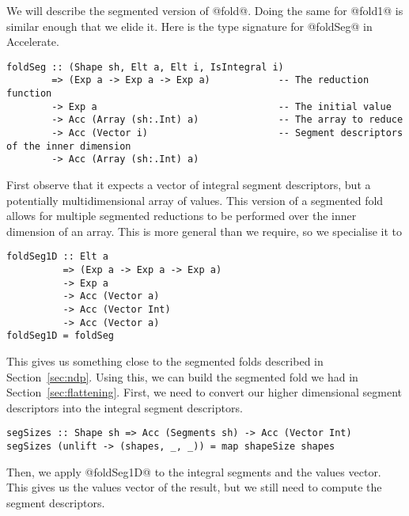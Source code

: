 We will describe the segmented version of @fold@. Doing the same for @fold1@ is similar enough that we elide it. Here is the type signature for @foldSeg@ in Accelerate.
%
\begin{lstlisting}
foldSeg :: (Shape sh, Elt a, Elt i, IsIntegral i)
        => (Exp a -> Exp a -> Exp a)            -- The reduction function
        -> Exp a                                -- The initial value
        -> Acc (Array (sh:.Int) a)              -- The array to reduce
        -> Acc (Vector i)                       -- Segment descriptors of the inner dimension
        -> Acc (Array (sh:.Int) a)
\end{lstlisting}
%
First observe that it expects a vector of integral segment descriptors, but a potentially multidimensional array of values. This version of a segmented fold allows for multiple segmented reductions to be performed over the inner dimension of an array. This is more general than we require, so we specialise it to
%
\begin{lstlisting}
foldSeg1D :: Elt a
          => (Exp a -> Exp a -> Exp a)
          -> Exp a
          -> Acc (Vector a)
          -> Acc (Vector Int)
          -> Acc (Vector a)
foldSeg1D = foldSeg
\end{lstlisting}
%
This gives us something close to the segmented folds described in Section~\ref{sec:ndp}. Using this, we can build the segmented fold we had in Section~\ref{sec:flattening}. First, we need to convert our higher dimensional segment descriptors into the integral segment descriptors.
%
\begin{lstlisting}
segSizes :: Shape sh => Acc (Segments sh) -> Acc (Vector Int)
segSizes (unlift -> (shapes, _, _)) = map shapeSize shapes
\end{lstlisting}
%
Then, we apply @foldSeg1D@ to the integral segments and the values vector. This gives us the values vector of the result, but we still need to compute the segment descriptors.

